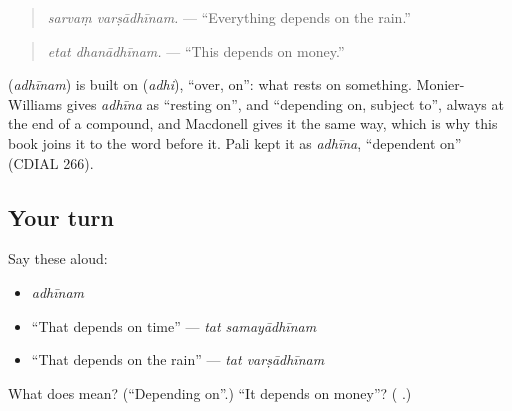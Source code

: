 \begin{quote}
\textbf{ }
\end{quote}

\begin{quote}
\emph{sarvaṃ varṣādhīnam.} — \textquotedblleft{}Everything depends on the rain.\textquotedblright{}
\end{quote}

\begin{quote}
\textbf{ }
\end{quote}

\begin{quote}
\emph{etat dhanādhīnam.} — \textquotedblleft{}This depends on money.\textquotedblright{}
\end{quote}

\begin{cousinweb}
\textbf{} (\emph{adhīnam}) is built on \textbf{} (\emph{adhi}), \textquotedblleft{}over, on\textquotedblright{}: what rests on something. Monier-Williams gives \emph{adhīna} as \textquotedblleft{}resting on\textquotedblright{}, and \textquotedblleft{}depending on, subject to\textquotedblright{}, always at the end of a compound, and Macdonell gives it the same way, which is why this book joins it to the word before it. Pali kept it as \emph{adhīna}, \textquotedblleft{}dependent on\textquotedblright{} (CDIAL 266).
\end{cousinweb}

\subsection*{Your turn}
Say these aloud:

\begin{itemize}
\raggedright
  \item \emph{adhīnam}
  \item \textquotedblleft{}That depends on time\textquotedblright{} — \emph{tat samayādhīnam}
  \item \textquotedblleft{}That depends on the rain\textquotedblright{} — \emph{tat varṣādhīnam}
\end{itemize}

\begin{tcolorbox}[breakable,colback=teal!4,colframe=teal!35!black,title={Before you move on}]
What does \textbf{} mean? (\textquotedblleft{}Depending on\textquotedblright{}.) \textquotedblleft{}It depends on money\textquotedblright{}? (\textbf{ }.)
\end{tcolorbox}
